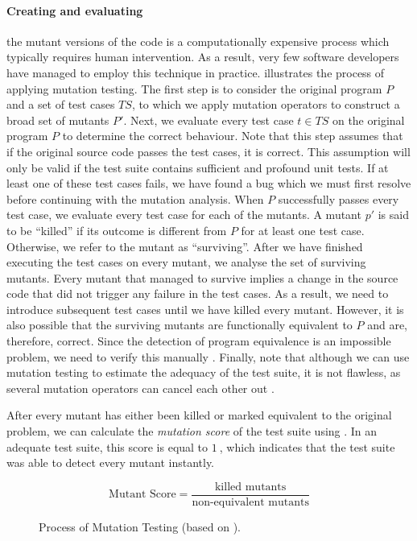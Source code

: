 \paragraph*{Creating and evaluating} the mutant versions of the code is a computationally expensive process which typically requires human intervention. As a result, very few software developers have managed to employ this technique in practice.  illustrates the process of applying mutation testing. The first step is to consider the original program $P$ and a set of test cases $TS$, to which we apply mutation operators to construct a broad set of mutants $P'$. Next, we evaluate every test case $t \in TS$ on the original program $P$ to determine the correct behaviour. Note that this step assumes that if the original source code passes the test cases, it is correct. This assumption will only be valid if the test suite contains sufficient and profound unit tests. If at least one of these test cases fails, we have found a bug which we must first resolve before continuing with the mutation analysis. When $P$ successfully passes every test case, we evaluate every test case for each of the mutants. A mutant $p'$ is said to be ``killed'' if its outcome is different from $P$ for at least one test case. Otherwise, we refer to the mutant as ``surviving''. After we have finished executing the test cases on every mutant, we analyse the set of surviving mutants. Every mutant that managed to survive implies a change in the source code that did not trigger any failure in the test cases. As a result, we need to introduce subsequent test cases until we have killed every mutant. However, it is also possible that the surviving mutants are functionally equivalent to $P$ and are, therefore, correct. Since the detection of program equivalence is an impossible problem, we need to verify this manually \cite{5487526, Offutt2001}. Finally, note that although we can use mutation testing to estimate the adequacy of the test suite, it is not flawless, as several mutation operators can cancel each other out \cite{evaluationoftestsuiteminimization}.

\clearpage

\noindent After every mutant has either been killed or marked equivalent to the original problem, we can calculate the \emph{mutation score} of the test suite using . In an adequate test suite, this score is equal to $\SI{1}{}$, which indicates that the test suite was able to detect every mutant instantly.

\begin{equation}\label{eq:mutant-score}
	\text{Mutant Score} = \frac{\text{killed mutants}}{\text{non-equivalent mutants}}
\end{equation}

\begin{figure}[h!]
	\centering
	
	\caption{Process of Mutation Testing (based on \cite{Offutt2001}).}
	\label{fig:mutation-testing}
\end{figure}